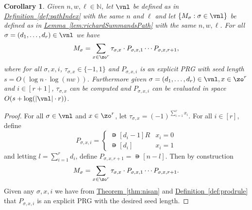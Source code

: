 \documentclass[11pt]{article}
\newcommand{\expref}[2]{\texorpdfstring{\hyperref[#2]{#1~\ref{#2}}}{#1~\ref{#2}}}
\newtheorem{corollary}[theorem]{Corollary}
\newcommand{\N}{{\mathbb N}}
\begin{document}
\begin{corollary}\label{cor:MstructPath}
Given $n,w,\ell \in \N$, let $\vnl$ be defined as in \expref{Definition}{def:pathIndex} with the same $n$ and $\ell$ and let $\{M_\sigma:\sigma\in\vnl\}$ be defined as in \expref{Lemma}{lem:richardSummandsPath} with the same $n,w,\ell$. For all $\sigma=(d_1,\dots,d_r)\in \vnl$ we have
\[M_\sigma=\sum_{x\in \zo^r}\tau_{\sigma,x}\cdot P_{\sigma,x,1}\cdots P_{\sigma,x,r+1},\]
where for all $\sigma,x,i$, $\tau_{\sigma,x}\in \{-1,1\}$ and $P_{\sigma,x,i}$ is an explicit PRG with seed length $s=O(\log n\cdot\log (nw))$.
Furthermore given $\sigma=(d_1,\dots,d_r)\in \vnl,x\in \zo^r$ and $i\in [r+1]$, $\tau_{\sigma,x}$ can be computed and $P_{\sigma,x,i}$ can be evaluated in space $O(s+\log(|\vnl|\cdot r))$.
\end{corollary}
\begin{proof}
For all $\sigma\in \vnl$ and $x\in \zo^{r}$, let $\tau_{\sigma,x}=(-1)^{\sum_{i=1}^{r}x_i}$. For all $i\in[r]$, define
\[P_{\sigma,x,i} = \begin{cases}
\nis[d_{i}-1]R & x_i=0\\
\nis[d_{i}] & x_i=1
\end{cases}\]
and letting $l=\sum_{i=1}^rd_i$, define $P_{\sigma,x,r+1}=\nis[n-l]$. Then by construction
\[M_\sigma=\sum_{x\in \zo^r}\tau_{\sigma,x}\cdot P_{\sigma,x,1}\cdots P_{\sigma,x,r+1}.\] 
Given any $\sigma,x,i$ we have from \expref{Theorem}{thm:nisan} and \expref{Definition}{def:prodrule} that $P_{\sigma,x,i}$ is an explicit PRG with the desired seed length.
\end{proof}
\end{document}
